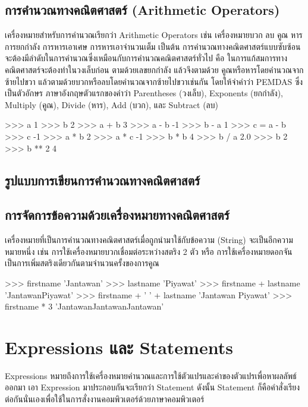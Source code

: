 \subsection{การคำนวณทางคณิตศาสตร์ (Arithmetic Operators)}

เครื่องหมายสำหรับการคำนวณเรียกว่า  Arithmetic Operators เช่น เครื่องหมายบวก ลบ คูณ หาร การยกกำลัง การหารเอาเศษ การหารเอาจำนวนเต็ม เป็นต้น การคำนวณทางคณิตศาสตร์แบบซับซ้อนจะต้องมีลำดับในการคำนวณซึ่งเหมือนกับการคำนวณคณิตศาสตร์ทั่วไป คือ ในการแก้สมการทางคณิตศาสตร์จะต้องทำในวงเล็บก่อน ตามด้วยเลขยกกำลัง แล้วจึงตามด้วย คูณหรือหารโดยคำนวณจากซ้ายไปขวา แล้วตามด้วยบวกหรือลบโดยคำนวณจากซ้ายไปขวาเช่นกัน โดยให้จำคำว่า PEMDAS ซึ่งเป็นตัวอักษร ภาษาอังกฤษตัวแรกของคำว่า Parentheses (วงเล็บ), Exponents (ยกกำลัง), Multiply (คูณ), Divide (หาร), Add (บวก), และ Subtract (ลบ) 

\begin{pycode}
>>> a
1
>>> b
2
>>> a + b
3
>>> a - b
-1
>>> b - a
1
>>> c = a - b
>>> c
-1
>>> a * b
2
>>> a * c
-1
>>> b * b
4
>>> b / a
2.0
>>> b
2
>>> b ** 2
4
\end{pycode}


\subsection{รูปแบบการเขียนการคำนวณทางคณิตศาสตร์}

\subsection{การจัดการข้อความด้วยเครื่องหมายทางคณิตศาสตร์}

เครื่องหมายที่เป็นการคำนวณทางคณิตศาสตร์เมื่อถูกนำมาใช้กับข้อความ (String) จะเป็นอีกความหมายหนึ่ง เช่น การใช้เครื่องหมายบวกเชื่อมต่อระหว่างสตริง 2 ตัว หรือ การใช้เครื่องหมายดอกจันเป็นการเพิ่มสตริงเดียวกันตามจำนวนครั้งของการคูณ

\begin{pycode}
>>> firstname
'Jantawan'
>>> lastname
'Piyawat'
>>> firstname + lastname
'JantawanPiyawat'
>>> firstname + '  ' + lastname
'Jantawan Piyawat'
>>> firstname * 3
'JantawanJantawanJantawan'
\end{pycode}


\section{Expressions และ Statements}

Expressions หมายถึงการใช้เครื่องหมายคำนวณและการใช้ตัวแปรและค่าของตัวแปรเพื่อหาผลลัพธ์ออกมา เอา Expression มาประกอบกันจะเรียกว่า Statement ดังนั้น Statement ก็คือคำสั่งเรียงต่อกันนั่นเองเพื่อใช้ในการสั่งงานคอมพิวเตอร์ด้วยภาษาคอมพิวเตอร์

